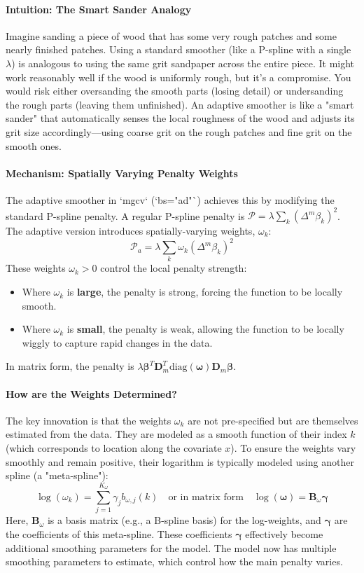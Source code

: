 \documentclass[11pt, a4paper]{article}
\begin{document}
\begin{itemize}
\paragraph{Intuition: The Smart Sander Analogy}
Imagine sanding a piece of wood that has some very rough patches and some nearly finished patches. Using a standard smoother (like a P-spline with a single $\lambda$) is analogous to using the same grit sandpaper across the entire piece. It might work reasonably well if the wood is uniformly rough, but it's a compromise. You would risk either oversanding the smooth parts (losing detail) or undersanding the rough parts (leaving them unfinished). An adaptive smoother is like a "smart sander" that automatically senses the local roughness of the wood and adjusts its grit size accordingly—using coarse grit on the rough patches and fine grit on the smooth ones.

\paragraph{Mechanism: Spatially Varying Penalty Weights}
The adaptive smoother in `mgcv` (`bs="ad"`) achieves this by modifying the standard P-spline penalty. A regular P-spline penalty is $\mathcal{P} = \lambda \sum_{k} (\Delta^m \beta_k)^2$. The adaptive version introduces spatially-varying weights, $\omega_k$:
\[ \mathcal{P}_a = \lambda \sum_{k} \omega_k (\Delta^m \beta_k)^2 \]
These weights $\omega_k > 0$ control the local penalty strength:
\begin{itemize}
 \item Where $\omega_k$ is \textbf{large}, the penalty is strong, forcing the function to be locally smooth.
 \item Where $\omega_k$ is \textbf{small}, the penalty is weak, allowing the function to be locally wiggly to capture rapid changes in the data.
\end{itemize}
In matrix form, the penalty is $\lambda \boldsymbol{\beta}^T \mathbf{D}_m^T \text{diag}(\boldsymbol{\omega}) \mathbf{D}_m \boldsymbol{\beta}$.

\paragraph{How are the Weights Determined?}
The key innovation is that the weights $\omega_k$ are not pre-specified but are themselves estimated from the data. They are modeled as a smooth function of their index $k$ (which corresponds to location along the covariate $x$). To ensure the weights vary smoothly and remain positive, their logarithm is typically modeled using another spline (a "meta-spline"):
\[ \log(\omega_k) = \sum_{j=1}^{K_{\omega}} \gamma_j b_{\omega,j}(k) \quad \text{or in matrix form} \quad \log(\boldsymbol{\omega}) = \mathbf{B}_{\omega}\boldsymbol{\gamma} \]
Here, $\mathbf{B}_{\omega}$ is a basis matrix (e.g., a B-spline basis) for the log-weights, and $\boldsymbol{\gamma}$ are the coefficients of this meta-spline. These coefficients $\boldsymbol{\gamma}$ effectively become additional smoothing parameters for the model. The model now has multiple smoothing parameters to estimate, which control how the main penalty varies.


\end{itemize}
\end{document}
